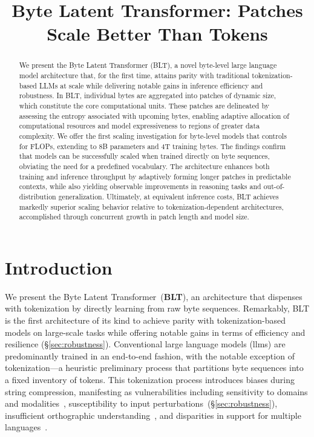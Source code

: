 \title{Byte Latent Transformer: Patches Scale Better Than Tokens}

\begin{abstract}
We present the Byte Latent Transformer ({\textsc BLT}), a novel byte-level large language model architecture that, for the first time, attains parity with traditional tokenization-based LLMs at scale while delivering notable gains in inference efficiency and robustness. In {\textsc BLT}, individual bytes are aggregated into patches of dynamic size, which constitute the core computational units. These patches are delineated by assessing the entropy associated with upcoming bytes, enabling adaptive allocation of computational resources and model expressiveness to regions of greater data complexity. We offer the first scaling investigation for byte-level models that controls for FLOPs, extending to 8B parameters and 4T training bytes. The findings confirm that models can be successfully scaled when trained directly on byte sequences, obviating the need for a predefined vocabulary. The architecture enhances both training and inference throughput by adaptively forming longer patches in predictable contexts, while also yielding observable improvements in reasoning tasks and out-of-distribution generalization. Ultimately, at equivalent inference costs, {\textsc BLT} achieves markedly superior scaling behavior relative to tokenization-dependent architectures, accomplished through concurrent growth in patch length and model size.
\end{abstract}

\section{Introduction}
\label{section:intro}

We present the Byte Latent Transformer~(\textbf{BLT}), an architecture that dispenses with tokenization by directly learning from raw byte sequences. Remarkably, BLT is the first architecture of its kind to achieve parity with tokenization-based models on large-scale tasks while offering notable gains in terms of efficiency and resilience (\S\ref{sec:robustness}).
Conventional large language models (llms) are predominantly trained in an end-to-end fashion, with the notable exception of tokenization—a heuristic preliminary process that partitions byte sequences into a fixed inventory of tokens. This tokenization process introduces biases during string compression, manifesting as vulnerabilities including sensitivity to domains and modalities~\citep{dagangetting}, susceptibility to input perturbations~(\S\ref{sec:robustness}), insufficient orthographic understanding~\citep{edman2024cute}, and disparities in support for multiple languages~\citep{liang2023xlm,petrov2024language,limisiewicz2024myte}.

